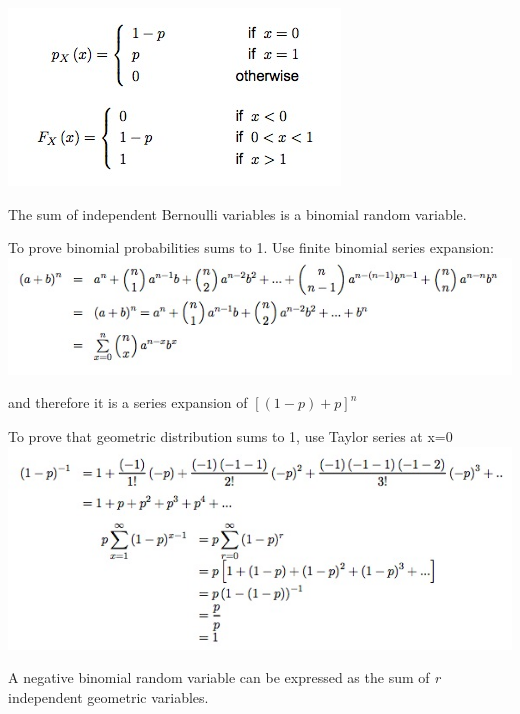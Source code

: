 \documentclass{examnotes}
\begin{document}
\includegraphics[scale=0.6]{./img/2ber.jpg}


The sum of independent Bernoulli variables is a binomial random variable. 

To prove binomial probabilities sums to 1. Use finite binomial series expansion:
\includegraphics[scale=0.7]{./img/2ber2.jpg}
\vspace{-10pt}

and therefore it is a series expansion of $[(1-p)+p]^n$

\vspace{6pt}

To prove that geometric distribution sums to 1, use Taylor series at x=0
\includegraphics[scale=0.7]{./img/2geo.jpg}


A negative binomial random variable can be expressed as the sum of \emph{r} independent geometric variables.
\end{document}
